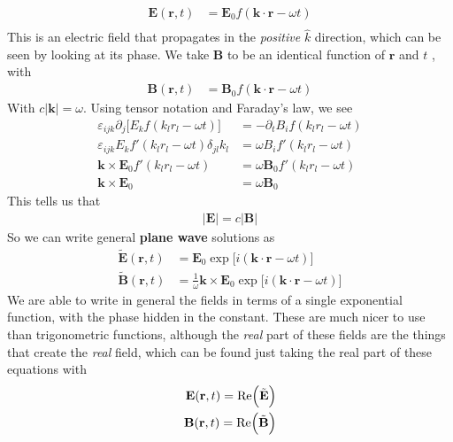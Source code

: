 \begin{align}
\textbf{E}(\textbf{r},t) &= \textbf{E}_0 f(\textbf{k}\cdot\textbf{r} -\omega t)\\
\end{align}
This is an electric field that propagates in the \emph{positive} $\hat{k}$ direction, which can be seen by looking at its phase. We take  $\textbf{B}$ to be an identical function of $\textbf{r}$ and $t$
, with
\begin{align}
\textbf{B}(\textbf{r},t) &= \textbf{B}_0 f(\textbf{k}\cdot\textbf{r} -\omega t)
\end{align}
With $c|\textbf{k}| = \omega$. Using tensor notation and Faraday's law, we see
\begin{align}
\varepsilon_{ijk}\partial_j\Big[E_k f(k_lr_l-\omega t)\Big] &= -\partial_tB_if(k_lr_l-\omega t)\\
\varepsilon_{ijk}E_kf'(k_lr_l-\omega t)\delta_{jl}k_l &= \omega B_if'(k_lr_l-\omega t)\\
\textbf{k}\times\textbf{E}_0f'(k_lr_l-\omega t) &= \omega \textbf{B}_0f'(k_lr_l-\omega t)\\
\textbf{k}\times\textbf{E}_0 &= \omega \textbf{B}_0
\end{align}
This tells us that
\begin{align}
|\textbf{E}| = c|\textbf{B}|
\end{align}
So we can write general \textbf{plane wave} solutions as
\begin{align}
\tilde{\textbf{E}}(\textbf{r},t) &= \textbf{E}_0\exp\Big[i(\textbf{k}\cdot\textbf{r}-\omega t)\Big]\\
\tilde{\textbf{B}}(\textbf{r},t) &= \frac{1}{\omega}\textbf{k}\times\textbf{E}_0\exp\Big[i(\textbf{k}\cdot\textbf{r}-\omega t)\Big]
\end{align}
We are able to write in general the fields in terms of a single exponential function, with the phase hidden in the constant. These are much nicer to use than trigonometric functions, although the \emph{real} part of these fields are the things that create the \emph{real} field, which can be found just taking the real part of these equations with
\begin{align}
    \textbf{E}(\textbf{r},t) = \rm{Re}\Big(\tilde{\textbf{E}}\Big)\\
    \textbf{B}(\textbf{r},t) = \rm{Re}\Big(\tilde{\textbf{B}}\Big)
\end{align}



